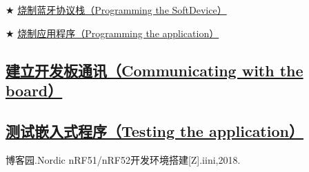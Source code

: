 \documentclass{WHUResearch}  %
\begin{document}
$\bigstar$ \href{https://infocenter.nordicsemi.com/index.jsp?topic=\%2Fug_gsg_keil\%2FUG\%2Fgsg\%2Fprogram_sd.html}{烧制蓝牙协议栈（Programming the SoftDevice）}

$\bigstar$ \href{https://infocenter.nordicsemi.com/index.jsp?topic=\%2Fug_gsg_keil\%2FUG\%2Fgsg\%2Fprogram_app_keil.html}{烧制应用程序（Programming the application）}

\subsection{\href{}{建立开发板通讯（Communicating with the board）}}

\subsection{\href{}{测试嵌入式程序（Testing the application）}}

\cleardoublepage{}
{}
\begin{thebibliography}{000}

   博客园.Nordic nRF51/nRF52开发环境搭建[Z].iini,2018.  
  
\end{thebibliography}

\cleardoublepage
\end{document}
